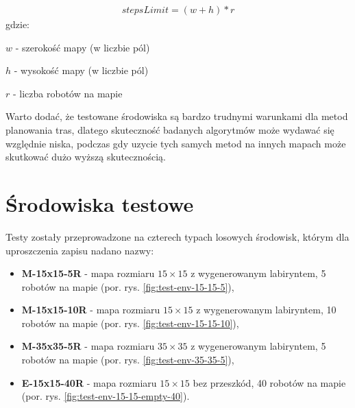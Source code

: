 \begin{gather}
 	stepsLimit = (w + h) * r
 	\label{eq:steps-limit} 
\end{gather}
 gdzie:

 $w$ - szerokość mapy (w liczbie pól)

 $h$ - wysokość mapy (w liczbie pól)

 $r$ - liczba robotów na mapie

Warto dodać, że testowane środowiska są bardzo trudnymi warunkami dla metod planowania tras, dlatego skuteczność badanych algorytmów może wydawać się względnie niska, podczas gdy uzycie tych samych metod na innych mapach może skutkować dużo wyższą skutecznością.

\section{Środowiska testowe}
Testy zostały przeprowadzone na czterech typach losowych środowisk, którym dla uproszczenia zapisu nadano nazwy:
\begin{itemize}
	\item {\bf M-15x15-5R} - mapa rozmiaru $15 \times 15$ z wygenerowanym labiryntem, 5 robotów na mapie (por. rys. \ref{fig:test-env-15-15-5}),
	\item {\bf M-15x15-10R} - mapa rozmiaru $15 \times 15$ z wygenerowanym labiryntem, 10 robotów na mapie (por. rys. \ref{fig:test-env-15-15-10}),
	\item {\bf M-35x35-5R} - mapa rozmiaru $35 \times 35$ z wygenerowanym labiryntem, 5 robotów na mapie (por. rys. \ref{fig:test-env-35-35-5}),
	\item {\bf E-15x15-40R} - mapa rozmiaru $15 \times 15$ bez przeszkód, 40 robotów na mapie (por. rys. \ref{fig:test-env-15-15-empty-40}).
\end{itemize}

